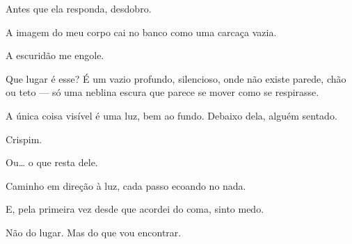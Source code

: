 Antes que ela responda, desdobro.

A imagem do meu corpo cai no banco como uma carcaça vazia.

\bigskip

A escuridão me engole.

Que lugar é esse?  
É um vazio profundo, silencioso, onde não existe parede, chão ou teto — só uma neblina escura que parece se mover como se respirasse.

A única coisa visível é uma luz, bem ao fundo.  
Debaixo dela, alguém sentado.

Crispim.

Ou… o que resta dele.

Caminho em direção à luz, cada passo ecoando no nada.

E, pela primeira vez desde que acordei do coma, sinto medo.

Não do lugar.  
Mas do que vou encontrar.
